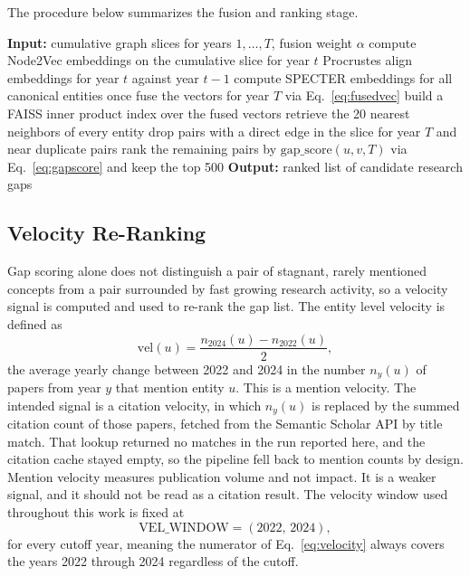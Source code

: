 \documentclass{ieeeaccess}
\begin{document}
The procedure below summarizes the fusion and ranking stage.

\begin{algorithmic}[1]
\STATE \textbf{Input:} cumulative graph slices for years $1, \dots, T$, fusion weight $\alpha$
    \STATE compute Node2Vec embeddings on the cumulative slice for year $t$
    \STATE Procrustes align embeddings for year $t$ against year $t-1$
\ENDFOR
\STATE compute SPECTER embeddings for all canonical entities once
\STATE fuse the vectors for year $T$ via Eq.~\eqref{eq:fusedvec}
\STATE build a FAISS inner product index over the fused vectors
\STATE retrieve the 20 nearest neighbors of every entity
\STATE drop pairs with a direct edge in the slice for year $T$ and near duplicate pairs
\STATE rank the remaining pairs by $\text{gap\_score}(u, v, T)$ via Eq.~\eqref{eq:gapscore} and keep the top 500
\STATE \textbf{Output:} ranked list of candidate research gaps
\end{algorithmic}

\subsection{Velocity Re-Ranking}
\label{sec:velocity}

Gap scoring alone does not distinguish a pair of stagnant, rarely mentioned concepts from a pair surrounded by fast growing research activity, so a velocity signal is computed and used to re-rank the gap list. The entity level velocity is defined as
\begin{equation}
\text{vel}(u) = \frac{n_{2024}(u) - n_{2022}(u)}{2},
\label{eq:velocity}
\end{equation}
the average yearly change between 2022 and 2024 in the number $n_y(u)$ of papers from year $y$ that mention entity $u$. This is a mention velocity. The intended signal is a citation velocity, in which $n_y(u)$ is replaced by the summed citation count of those papers, fetched from the Semantic Scholar API by title match. That lookup returned no matches in the run reported here, and the citation cache stayed empty, so the pipeline fell back to mention counts by design. Mention velocity measures publication volume and not impact. It is a weaker signal, and it should not be read as a citation result. The velocity window used throughout this work is fixed at
\begin{equation}
\text{VEL\_WINDOW} = (2022,\, 2024),
\label{eq:vel_window}
\end{equation}
for every cutoff year, meaning the numerator of Eq.~\eqref{eq:velocity} always covers the years 2022 through 2024 regardless of the cutoff.
\end{document}
